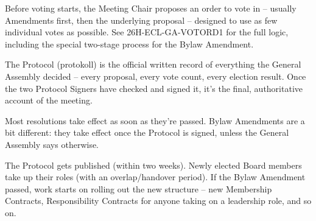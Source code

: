\documentclass{../../../Common/Latex/Templates/rapport}
\begin{document}
Before voting starts, the Meeting Chair proposes an order to vote in -- usually Amendments first, then the underlying proposal -- designed to use as few individual votes as possible. See 26H-ECL-GA-VOTORD1 for the full logic, including the special two-stage process for the Bylaw Amendment.

The Protocol (protokoll) is the official written record of everything the General Assembly decided -- every proposal, every vote count, every election result. Once the two Protocol Signers have checked and signed it, it's the final, authoritative account of the meeting.

Most resolutions take effect as soon as they're passed. Bylaw Amendments are a bit different: they take effect once the Protocol is signed, unless the General Assembly says otherwise.

The Protocol gets published (within two weeks). Newly elected Board members take up their roles (with an overlap/handover period). If the Bylaw Amendment passed, work starts on rolling out the new structure -- new Membership Contracts, Responsibility Contracts for anyone taking on a leadership role, and so on.
\end{document}
